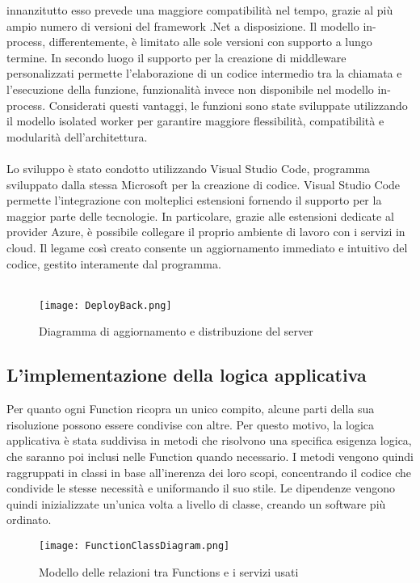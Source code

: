 innanzitutto esso prevede una maggiore compatibilità nel tempo, 
grazie al più ampio numero di versioni del framework .Net a disposizione.
Il modello in-process, differentemente, è limitato alle sole versioni con supporto a lungo termine.
In secondo luogo il supporto per la creazione di middleware personalizzati 
permette l'elaborazione di un codice intermedio tra la chiamata e l’esecuzione della funzione,
funzionalità invece non disponibile nel modello in-process.
Considerati questi vantaggi, le funzioni sono state sviluppate utilizzando il modello isolated worker 
per garantire maggiore flessibilità, compatibilità e modularità dell’architettura.\\
\\
Lo sviluppo è stato condotto utilizzando Visual Studio Code, 
programma sviluppato dalla stessa Microsoft per la creazione di codice.
Visual Studio Code permette l'integrazione con molteplici estensioni fornendo il supporto
per la maggior parte delle tecnologie.
In particolare, grazie alle estensioni dedicate al provider Azure, 
è possibile collegare il proprio ambiente di lavoro con i servizi in cloud.
Il legame così creato consente un aggiornamento immediato e intuitivo del codice, 
gestito interamente dal programma.\\
\\
\begin{figure}[h!]
    \begin{center}
        \texttt{[image: DeployBack.png]}
        \caption{Diagramma di aggiornamento e distribuzione del server}
    \end{center}
\end{figure}

\clearpage


\subsection{L'implementazione della logica applicativa}
Per quanto ogni Function ricopra un unico compito, 
alcune parti della sua risoluzione possono essere condivise con altre.
Per questo motivo, 
la logica applicativa è stata suddivisa in metodi che risolvono una specifica esigenza logica,
che saranno poi inclusi nelle Function quando necessario.
I metodi vengono quindi raggruppati in classi in base all'inerenza dei loro scopi, 
concentrando il codice che condivide le stesse necessità e uniformando il suo stile.
Le dipendenze vengono quindi inizializzate un'unica volta a livello di classe,
creando un software più ordinato.\\
\begin{figure}[h!]
    \begin{center}
        \texttt{[image: FunctionClassDiagram.png]}
        \caption{Modello delle relazioni tra Functions e i servizi usati}
    \end{center}
\end{figure}

